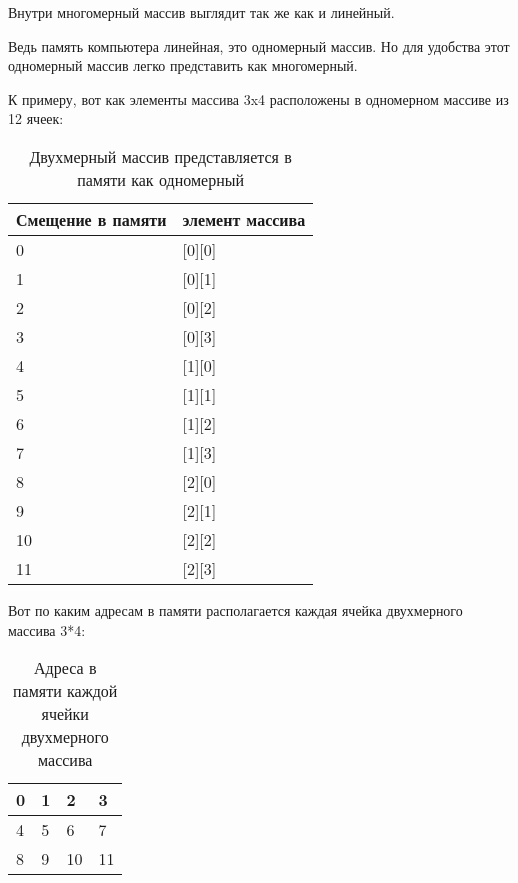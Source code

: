 
Внутри многомерный массив выглядит так же как и линейный.

Ведь память компьютера линейная, это одномерный массив.
Но для удобства этот одномерный массив легко представить как многомерный.

К примеру, вот как элементы массива 3x4 расположены в одномерном массиве из 12 ячеек:

\begin{table}[H]
\centering
\begin{tabular}{ | l | l | }
\hline
Смещение в памяти & элемент массива \\
\hline
0 & [0][0] \\
\hline
1 & [0][1] \\
\hline
2 & [0][2] \\
\hline
3 & [0][3] \\
\hline
4 & [1][0] \\
\hline
5 & [1][1] \\
\hline
6 & [1][2] \\
\hline
7 & [1][3] \\
\hline
8 & [2][0] \\
\hline
9 & [2][1] \\
\hline
10 & [2][2] \\
\hline
11 & [2][3] \\
\hline
\end{tabular}
\caption{Двухмерный массив представляется в памяти как одномерный}
\end{table}

Вот по каким адресам в памяти располагается каждая ячейка двухмерного массива 3*4:

\begin{table}[H]
\centering
\begin{tabular}{ | l | l | l | l | }
\hline                        
0 & 1 & 2 & 3 \\
\hline  
4 & 5 & 6 & 7 \\
\hline  
8 & 9 & 10 & 11 \\
\hline  
\end{tabular}
\caption{Адреса в памяти каждой ячейки двухмерного массива}
\end{table}

